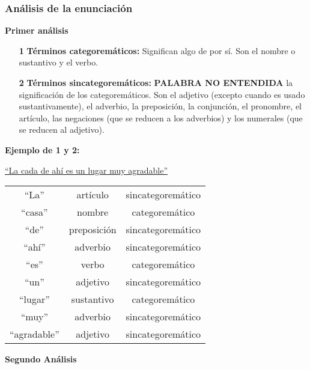 \documentclass{article}
\begin{document}
\subsubsection{Análisis de la enunciación}
    \textbf{Primer análisis}
    \begin{itemize}
        \item[\textbf{1}] \textbf{Términos categoremáticos:} Significan algo de por sí. Son  el nombre o sustantivo y el verbo.
        \item[\textbf{2}] \textbf{Términos sincategoremáticos:} \textbf{PALABRA NO ENTENDIDA} la significación de los categoremáticos. Son  el adjetivo (excepto cuando es usado sustantivamente), el adverbio, la preposición, la conjunción, el pronombre, el artículo, las negaciones (que se reducen a los adverbios) y los numerales (que se reducen al adjetivo).
    \end{itemize}
    
    \textbf{Ejemplo de 1 y 2:}
    
   \begin{center}
        \underline{``La cada de ahí es un lugar muy agradable''}\\
         \begin{tabular}{c c c}
        ``La''        & artículo    & sincategoremático \\
        ``casa''      & nombre      & categoremático    \\
        ``de''        & preposición & sincategoremático \\
        ``ahí''       & adverbio    & sincategoremático \\
        ``es''        & verbo       & categoremático    \\
        ``un''        & adjetivo    & sincategoremático \\
        ``lugar''     & sustantivo  & categoremático    \\
        ``muy''       & adverbio    & sincategoremático \\
        ``agradable'' & adjetivo    & sincategoremático \\
        \end{tabular}
   \end{center} 
   \textbf{Segundo Análisis}
   
\end{document}
